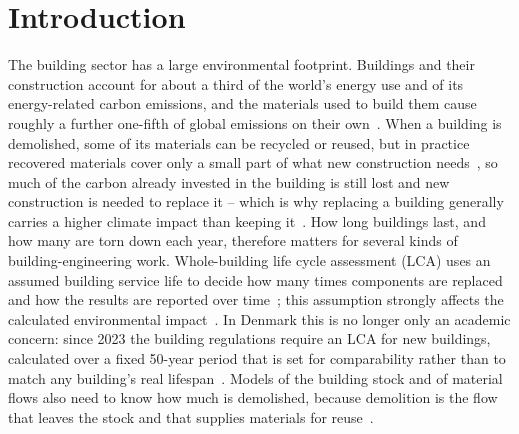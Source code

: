 \section{Introduction}\label{sec:intro}


The building sector has a large environmental footprint. Buildings and
their construction account for about a third of the world's energy use and
of its energy-related carbon emissions, and the materials used to build
them cause roughly a further one-fifth of global emissions on their
own~\cite{unep2025gsr}. When a building is demolished, some of its
materials can be recycled or reused, but in practice recovered materials
cover only a small part of what new construction
needs~\cite{andersen2022adaptation}, so much of the carbon already invested
in the building is still lost and new construction is needed to replace
it -- which is why replacing a building generally carries a higher climate
impact than keeping it~\cite{huuhka2023renovate}. How long buildings last, and how many are torn down
each year, therefore matters for several kinds of building-engineering
work. Whole-building life cycle assessment (LCA) uses an assumed building
service life to decide how many times components are replaced and how the
results are reported over time~\cite{ostergaard2018temporal,iso15686}; this
assumption strongly affects the calculated environmental
impact~\cite{andersen2023lifespan}. In Denmark this is no longer only an
academic concern: since 2023 the building regulations require an LCA for
new buildings, calculated over a fixed 50-year period that is set for
comparability rather than to match any building's real
lifespan~\cite{br18_klima}. Models of the building stock and of material flows
also need to know how much is demolished, because demolition is the flow
that leaves the stock and that supplies materials for
reuse~\cite{negendahl2022parametric,andersen2022adaptation}.

